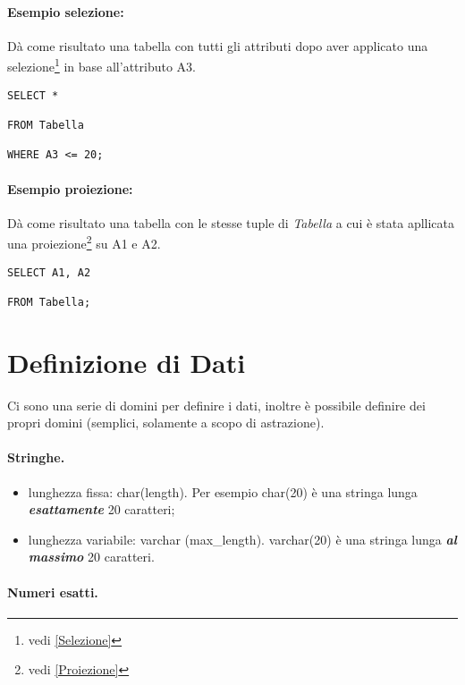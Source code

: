 \paragraph{Esempio selezione:} Dà come risultato una tabella con tutti gli attributi dopo aver applicato una selezione\footnote{vedi \ref{Selezione}} in base all'attributo A3.

\begin{lstlisting}[style=SQL, caption=Semplice selezione]
SELECT *

FROM Tabella

WHERE A3 <= 20;
\end{lstlisting}

\paragraph{Esempio proiezione:} Dà come risultato una tabella con le stesse tuple di \textit{Tabella} a cui è stata apllicata una proiezione\footnote{vedi \ref{Proiezione}} su A1 e A2. 

\begin{lstlisting}[style=SQL, caption=Semplice proiezione]
SELECT A1, A2
    
FROM Tabella;
\end{lstlisting}

\section{Definizione di Dati}

Ci sono una serie di domini per definire i dati, inoltre è possibile definire dei propri domini (semplici, solamente a scopo di astrazione).

\paragraph{Stringhe.}

\begin{itemize}
    \item lunghezza fissa: char(length). Per esempio char(20) è una stringa lunga \textit{\textbf{esattamente}} 20 caratteri;
    \item lunghezza variabile: varchar (max\_length). varchar(20) è una stringa lunga \textit{\textbf{al massimo}} 20 caratteri.
\end{itemize}

\paragraph{Numeri esatti.}

